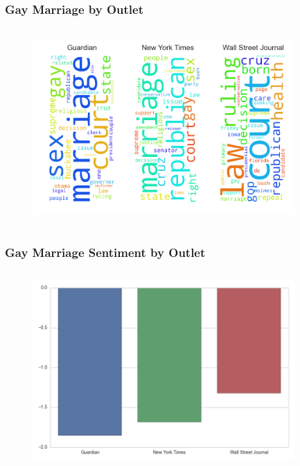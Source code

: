 \documentclass[11pt]{beamer}
\begin{document}
\begin{frame}
\frametitle{Gay Marriage by Outlet}

\begin{figure}
\centering
\includegraphics[width=100mm,height=75mm]{figures/source_within_topic14.png}
\end{figure} 

\end{frame}


\begin{frame}
\frametitle{Gay Marriage Sentiment by Outlet}

\begin{figure}
\centering
\includegraphics[width=100mm,height=75mm]{figures/source_sentiment_topic14.png}
\end{figure} 

\end{frame}

\end{document}
